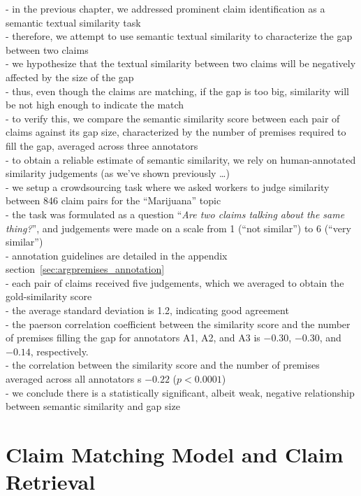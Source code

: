 - in the previous chapter, we addressed prominent claim identification as a semantic
textual similarity task \\
- therefore, we attempt to use semantic textual similarity to characterize the gap
between two claims \\
- we hypothesize that the textual similarity between two claims will be
negatively affected by the size of the gap \\
- thus, even though the claims are matching, if the gap is too big, similarity will be not 
high enough to indicate the match \\
- to verify this, we compare the semantic similarity score between each pair of 
claims against its gap size, characterized by the number of premises required to fill the gap, 
averaged across three annotators \\
- to obtain a reliable estimate of semantic similarity, we rely on human-annotated 
similarity judgements (as we've shown previously \dots)\\
- we setup a crowdsourcing task where we asked workers to judge similarity
between 846 claim pairs for the ``Marijuana'' topic \\
- the task was formulated as a question ``\emph{Are two claims
talking about the same thing?}'', and judgements were made on a scale
from 1 (``not similar'') to 6 (``very similar'') \\
- annotation guidelines are detailed in the appendix section~\ref{sec:argpremises_annotation} \\
- each pair of claims received five judgements, which we averaged to obtain the gold-similarity score \\
- the average standard deviation is 1.2, indicating good agreement \\

- the paerson correlation coefficient  between the similarity score and the number of premises 
filling the gap for annotators A1, A2, and A3 is $-0.30$, $-0.30$, and $-0.14$, respectively. \\
- the correlation between the similarity score and the number of premises averaged 
across all annotators s $-0.22$ ($p < 0.0001$) \\
- we conclude there is a statistically significant, albeit weak, negative relationship 
between semantic similarity and gap size \\


\section{Claim Matching Model and Claim Retrieval}

